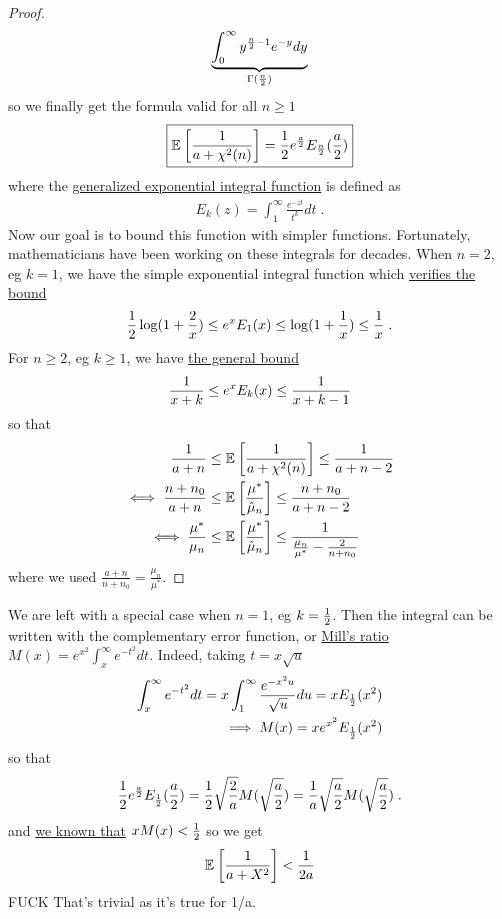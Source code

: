 \documentclass{article}
\newcommand*{\expect}[2][]{\ensuremath{\mathbb{E}_{#1} \left[ #2 \right] }} %
\newcommand{\MAPm}{\hat \mu_n}
\begin{document}
\begin{proof}
\begin{align}
		\underbrace{\int_0^\infty  y^{\frac{n}{2}-1} e^{-y} dy}_{\Gamma(\half[n])}
	\end{align}
	so we finally get  the formula valid for all $n\geq 1$
	\begin{align}
		\boxed{\expect{\inv{a + \chi^2(n)}}  = \half e^{\frac{a}{2}} E_{\half[n]}(\half[a])}
		\label{eq:hard_expectation}
	\end{align}
	where the \href{https://dlmf.nist.gov/8.19}{generalized exponential integral function} is defined as 
	\begin{align}
		E_k(z) = \int_1^\infty \frac{e^{-z t} }{t^k} dt \; .
	\end{align}
	Now our goal is to bound this function with simpler functions.
	Fortunately, mathematicians have been working on these integrals for decades.
	When $n=2$, eg $k=1$, we have the simple exponential integral function which \href{https://dlmf.nist.gov/6.8\#E1}{verifies the bound}
	\begin{align}
		\half \log(1 + \frac{2}{x}) 
		\leq e^x E_1(x) 
		\leq \log(1+\inv{x}) \leq \inv{x} \; .
	\end{align}
	For $n \geq 2$, eg $k\geq 1$, we have \href{https://dlmf.nist.gov/8.19\#E21}{the general bound}
	\begin{align}
		\inv{x+k}
		\leq e^x E_k(x) 
		\leq \inv{x + k - 1}
	\end{align}
	so that 
	\begin{align}
		\inv{a+n}
		&\leq \expect{\inv{a + \chi^2(n)}}
		\leq \inv{a + n - 2} \\
		\iff \frac{n +n_0}{a + n}	
		&\leq  \expect{\frac{\mu^*}{\MAPm}} 
		\leq \frac{n +n_0}{a + n - 2}	\\
		\iff \frac{\mu^*}{\mu_n}
		&\leq \expect{\frac{\mu^*}{\MAPm}} 
		\leq \frac{1}{\frac{\mu_n}{\mu^*} - \frac{2}{n + n_0}}  
		\label{eq:theta_expectation_bound}
	\end{align}
	where we used $\frac{a + n}{n +n_0} = \frac{\mu_n}{\mu^*}$.
\end{proof}

We are left with a special case when  $n=1$, eg $k=\half$. Then the integral can be written with the complementary error function, or \href{https://dlmf.nist.gov/7.8#E1}{Mill's ratio} $M(x) = e^{x^2} \int_x^\infty e^{-t^2} dt$. Indeed, taking $t= x \sqrt{u}$
\begin{align}
	\int_x^\infty e^{-t^2} dt = x \int_1^\infty \frac{e^{-x^2 u}}{\sqrt{u}} du = x E_{\half}(x^2) \\
	\implies M(x) = x e^{x^2} E_{\half}(x^2)
\end{align}
so that 
\begin{align}
		\half e^{\half[a]} E_{\half[1]}(\half[a]) 
		= \half \sqrt{\frac{2}{a}} M(\sqrt{\half[a]})
		= \inv{a} \sqrt{\half[a]} M(\sqrt{\half[a]}) \; .
\end{align}
and \href{https://dlmf.nist.gov/7.8#E5}{we known that} $x M(x) < \half$ so we get 
\begin{align}
	\expect{\inv{a + X^2}} < \inv{2 a}
\end{align}
FUCK That's  trivial as  it's true for 1/a.
\end{document}
